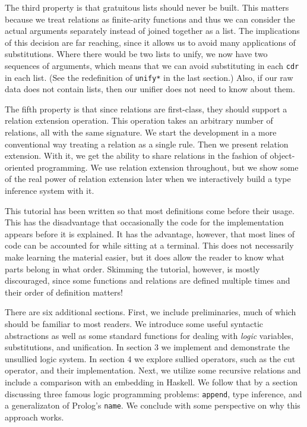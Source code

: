 The third property is that gratuitous lists should never be built.
This matters because we treat relations as finite-arity functions and
thus we can consider the actual arguments separately instead of joined
together as a list.  The implications of this decision are far
reaching, since it allows us to avoid many applications of
substitutions.  Where there would be two lists to unify, we now have
two sequences of arguments, which means that we can avoid substituting
in each \texttt{cdr} in each list. (See the redefinition of
\texttt{unify*} in the last section.)  Also, if our raw data does not
contain lists, then our unifier does not need to know about them.

The fifth property is that since relations are first-class, they
should support a relation extension operation.  This operation takes
an arbitrary number of relations, all with the same signature.
We start the development in a more conventional way treating
a relation as a single rule.  Then we present relation extension.
With it, we get the ability to share relations in the fashion
of object-oriented programming.  We use relation extension throughout,
but we show some of the real power of relation extension later when we
interactively build a type inference system with it.

This tutorial has been written so that most definitions come before
their usage.  This has the disadvantage that occasionally the code for
the implementation appears before it is explained.  It has the
advantage, however, that most lines of code can be accounted for while
sitting at a terminal.  This does not necessarily make learning the
material easier, but it does allow the reader to know what parts
belong in what order.  Skimming the tutorial, however, is mostly
discouraged, since some functions and relations are defined multiple
times and their order of definition matters!

There are six additional sections.  First, we include preliminaries, much
of which should be familiar to most readers.  We introduce some useful
syntactic abstractions as well as some standard functions for dealing with
\emph{logic} variables, substitutions, and unification.  In section 3 we
implement and demonstrate the unsullied logic system.  In section 4 we
explore sullied operators, such as the cut operator, and their
implementation. Next, we utilize some recursive relations and include a
comparison with an embedding in Haskell.  We follow that by a section
discussing three famous logic programming problems: \texttt{append}, type
inference, and a generalizaton of Prolog's \texttt{name}.  We conclude with
some perspective on why this approach works.

